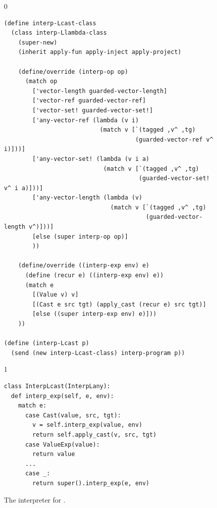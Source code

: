 \documentclass[7x10]{TimesAPriori_MIT}%
\def\racketEd{0}
\def\pythonEd{1}
\def\edition{1}
\newcommand{\pythonColor}[0]{}
\numberwithin{theorem}{chapter}
\numberwithin{definition}{chapter}
\numberwithin{equation}{chapter}
\begin{document}
\begin{figure}[tbp]
\begin{tcolorbox}[colback=white]  
{\if\edition\racketEd    
\begin{lstlisting}[basicstyle=\ttfamily\footnotesize]
(define interp-Lcast-class
  (class interp-Llambda-class
    (super-new)
    (inherit apply-fun apply-inject apply-project)

    (define/override (interp-op op)
      (match op
        ['vector-length guarded-vector-length]
        ['vector-ref guarded-vector-ref]
        ['vector-set! guarded-vector-set!]
        ['any-vector-ref (lambda (v i)
                           (match v [`(tagged ,v^ ,tg)
                                     (guarded-vector-ref v^ i)]))]
        ['any-vector-set! (lambda (v i a)
                            (match v [`(tagged ,v^ ,tg)
                                      (guarded-vector-set! v^ i a)]))]
        ['any-vector-length (lambda (v)
                              (match v [`(tagged ,v^ ,tg)
                                        (guarded-vector-length v^)]))]
        [else (super interp-op op)]
        ))

    (define/override ((interp-exp env) e)
      (define (recur e) ((interp-exp env) e))
      (match e
        [(Value v) v]
        [(Cast e src tgt) (apply_cast (recur e) src tgt)]
        [else ((super interp-exp env) e)]))
    ))

(define (interp-Lcast p)
  (send (new interp-Lcast-class) interp-program p))
\end{lstlisting}
\fi}
{\if\edition\pythonEd\pythonColor
\begin{lstlisting}[basicstyle=\ttfamily\footnotesize]
class InterpLcast(InterpLany):
  def interp_exp(self, e, env):
    match e:
      case Cast(value, src, tgt):
        v = self.interp_exp(value, env)
        return self.apply_cast(v, src, tgt)
      case ValueExp(value):
        return value
      ...
      case _:
        return super().interp_exp(e, env)
\end{lstlisting}
\fi}
\end{tcolorbox}

\caption{The interpreter for \LangCast{}.}
  \label{fig:interp-Lcast}
\end{figure}
\end{document}
